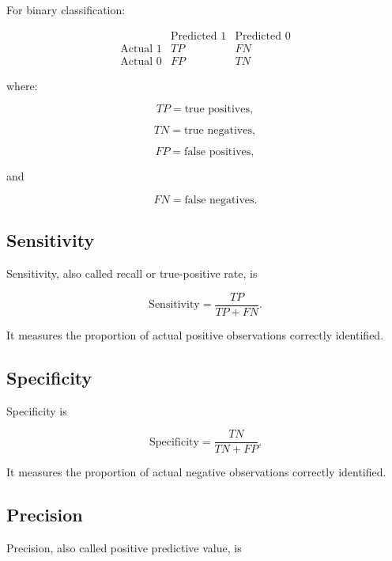 For binary classification:

\[
\begin{array}{c|cc}
&
\text{Predicted }1
&
\text{Predicted }0
\\
\hline
\text{Actual }1
&
TP
&
FN
\\
\text{Actual }0
&
FP
&
TN
\end{array}
\]

where:

\[
TP
=
\text{true positives},
\]

\[
TN
=
\text{true negatives},
\]

\[
FP
=
\text{false positives},
\]

and

\[
FN
=
\text{false negatives}.
\]

\subsection{Sensitivity}
\label{subsec:sensitivity-learning}

Sensitivity, also called recall or true-positive rate, is

\[
\boxed{
\text{Sensitivity}
=
\frac{
TP
}{
TP+FN
}.
}
\]

It measures the proportion of actual positive observations correctly
identified.

\subsection{Specificity}
\label{subsec:specificity-learning}

Specificity is

\[
\boxed{
\text{Specificity}
=
\frac{
TN
}{
TN+FP
}.
}
\]

It measures the proportion of actual negative observations correctly
identified.

\subsection{Precision}
\label{subsec:precision-learning}

Precision, also called positive predictive value, is

